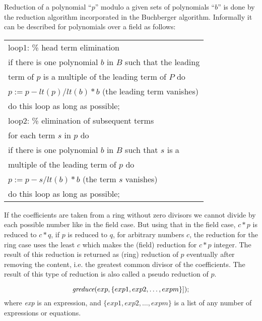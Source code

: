  \label{groebner:background}
Reduction of a polynomial ``$p$'' modulo a given sets of polynomials
``$b$'' is done by the reduction algorithm incorporated in the
Buchberger algorithm. Informally it can be described for
polynomials over a field as follows:
\begin{center}
\begin{tabular}{l}
loop1: \hspace*{2mm}\% head term elimination \\
\hspace*{-1cm} if there is one polynomial $b$ in $B$ such that the
leading \\ term of $p$ is a multiple of the leading term of $P$ do \\
$p := p - lt(p)/lt(b) * b$  (the leading term vanishes)\\
\hspace*{-1cm} do this loop as long as possible; \\
loop2: \hspace*{2mm} \% elimination of subsequent terms \\
\hspace*{-1cm} for each term $s$ in $p$ do \\
if there is one polynomial $b$ in $B$ such that $s$ is a\\
multiple of the leading term of $p$ do \\
$p := p - s/lt(b) * b$ (the term $s$ vanishes) \\
\hspace*{-1cm}do this loop as long as possible;
\end{tabular}
\end{center}

If the coefficients are taken from a ring without zero divisors we
cannot divide by each possible number like in the field case. But
using that in the field case,  $c*p $ is reduced to  $c*q $, if $ p $
is reduced to $ q $, for arbitrary numbers $ c $,  the reduction for
the ring case uses the least $ c $ which makes the (field) reduction
for $ c*p $ integer. The result of this reduction is returned as
(ring) reduction of $ p $ eventually after removing the content, i.e.
the greatest common divisor of the coefficients. The result of this
type of reduction is also called a pseudo reduction of $ p $.

\[
\mbox{\it greduce}(exp, \{exp1, exp2, \ldots , expm\}]);
\]
where {\it exp} is an expression, and $\{exp1, exp2,\ldots , expm\}$ is
a list of any number of expressions or equations.

